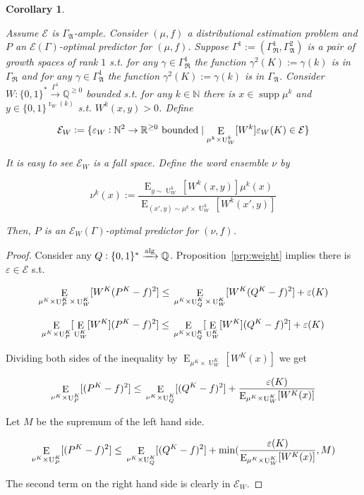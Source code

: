\documentclass{article}
\numberwithin{equation}{section}
\theoremstyle{definition}
\theoremstyle{plain}
\newtheorem{corollary}{Corollary}[section]
\newcommand{\Bool}{\{0,1\}}
\newcommand{\Words}{{\Bool^*}}
\newcommand{\WordsLen}[1]{{\Bool^{#1}}}
\DeclareMathOperator{\Supp}{supp}
\DeclareMathOperator{\E}{E}
\DeclareMathOperator{\R}{r}
\DeclareMathOperator{\Un}{U}
\newcommand{\Nats}{\mathbb{N}}
\newcommand{\Rats}{\mathbb{Q}}
\newcommand{\Reals}{\mathbb{R}}
\newcommand{\GrowR}{\Gamma_{\mathfrak{R}}}
\newcommand{\GrowA}{\Gamma_{\mathfrak{A}}}
\newcommand{\Fall}{\mathcal{E}}
\newcommand{\EG}{\Fall(\Gamma)}
\newcommand{\Alg}{\xrightarrow{\textnormal{alg}}}
\begin{document}
\begin{samepage}
\begin{corollary}
\label{crl:weight}

Assume $\Fall$ is $\GrowA$-ample. Consider $(\mu,f)$ a distributional estimation problem and $P$ an $\EG$-optimal predictor for $(\mu,f)$. Suppose ${\Gamma^1:=(\GrowR^1,\GrowA^2)}$ is a pair of growth spaces of rank $1$ s.t. for any $\gamma \in \GrowR^1$ the function ${\gamma^2(K):=\gamma(k)}$ is in $\GrowR$ and for any $\gamma \in \GrowA^1$ the function $\gamma^2(K):=\gamma(k)$ is in $\GrowA$. Consider ${W: \Words \xrightarrow{\Gamma^1} \Rats^{\geq 0}}$ bounded s.t. for any $k \in \Nats$ there is $x \in \Supp \mu^k$ and $y \in \WordsLen{\R_W(k)}$ s.t. $W^k(x,y) > 0$. Define 

$${\Fall_W:=\{\varepsilon_W: \Nats^2 \rightarrow \Reals^{\geq 0} \textnormal{ bounded} \mid  \E_{\mu^k \times \Un_W^k}[W^k]\varepsilon_W(K) \in \Fall\}}$$

It is easy to see $\Fall_W$ is a fall space. Define the word ensemble $\nu$ by 

\[\nu^k(x):=\frac{\E_{y \sim \Un_W^k}[W^k(x,y)] \mu^k(x)}{\E_{(x',y) \sim \mu^k \times \Un_W^k}[W^k(x',y)]}\]

Then, $P$ is an $\Fall_W(\Gamma)$-optimal predictor for $(\nu,f)$.

\end{corollary}
\end{samepage}

\begin{proof}

Consider any $Q: \Words \Alg \Rats$. Proposition~\ref{prp:weight} implies there is $\varepsilon \in \Fall$ s.t.

$$\E_{\mu^{K} \times \Un_P^{K} \times \Un_W^{K}}[W^{K}(P^{K} - f)^2] \leq \\ \E_{\mu^{K} \times \Un_Q^{K} \times \Un_W^{K}}[W^{K}(Q^{K} - f)^2] + \varepsilon(K)$$

$$\E_{\mu^{K} \times \Un_P^{K}}[\E_{\Un_W^{K}}[W^{K}](P^{K} - f)^2] \leq \\ \E_{\mu^{K} \times \Un_Q^{K}}[\E_{\Un_W^{K}}[W^{K}](Q^{K} - f)^2] + \varepsilon(K)$$

Dividing both sides of the inequality by $\E_{\mu^{K} \times \Un_W^{K}}[W^{K}(x)]$ we get

$$\E_{\nu^{K} \times \Un_P^{K}}[(P^{K} - f)^2] \leq \\ \E_{\nu^{K} \times \Un_Q^{K}}[(Q^{K} - f)^2] + \frac{\varepsilon(K)}{\E_{\mu^{K} \times \Un_W^{K}}[W^{K}(x)]}$$

Let $M$ be the supremum of the left hand side.

$$\E_{\nu^{K} \times \Un_P^{K}}[(P^{K} - f)^2] \leq \\ \E_{\nu^{K} \times \Un_Q^{K}}[(Q^{K} - f)^2] + \min(\frac{\varepsilon(K)}{\E_{\mu^{K} \times \Un_W^{K}}[W^{K}(x)]},M)$$

The second term on the right hand side is clearly in $\Fall_W$.
\end{proof}
\end{document}
